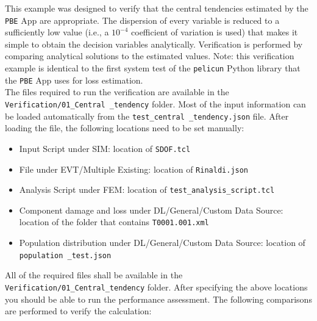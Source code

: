 This example was designed to verify that the central tendencies estimated by the \texttt{PBE} App are appropriate. The dispersion of every variable is reduced to a sufficiently low value (i.e., a $10^{-4}$ coefficient of variation is used) that makes it simple to obtain the decision variables analytically. Verification is performed by comparing analytical solutions to the estimated values. Note: this verification example is identical to the first system test of the \texttt{pelicun} Python library that the \texttt{PBE} App uses for loss estimation.\\

The files required to run the verification are available in the \texttt{Verification/01\_Central \_tendency} folder. Most of the input information can be loaded automatically from the \texttt{test\_central \_tendency.json} file. After loading the file, the following locations need to be set manually:

\begin{itemize}
    \item Input Script under SIM: location of \texttt{SDOF.tcl}
    \item File under EVT/Multiple Existing: location of \texttt{Rinaldi.json}
    \item Analysis Script under FEM: location of \texttt{test\_analysis\_script.tcl}
    \item Component damage and loss under DL/General/Custom Data Source: location of the folder that contains \texttt{T0001.001.xml}
    \item Population distribution under DL/General/Custom Data Source: location of \texttt{population \_test.json}
\end{itemize}

All of the required files shall be available in the \texttt{Verification/01\_Central\_tendency} folder. After specifying the above locations you should be able to run the performance assessment. The following comparisons are performed to verify the calculation:

